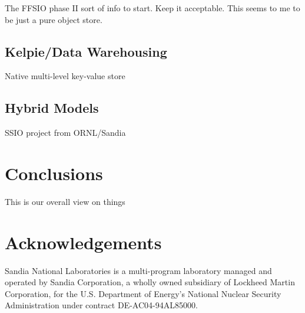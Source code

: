 The FFSIO phase II sort of info to start. Keep it acceptable. This seems to me
to be just a pure object store.

\subsection{Kelpie/Data Warehousing}

Native multi-level key-value store

\subsection{Hybrid Models}

SSIO project from ORNL/Sandia

\section{Conclusions}\label{sec:intro}

This is our overall view on things

\section*{Acknowledgements}
Sandia National Laboratories is a multi-program laboratory managed and operated
by Sandia Corporation, a wholly owned subsidiary of Lockheed Martin
Corporation, for the U.S. Department of Energy's National Nuclear Security
Administration under contract DE-AC04-94AL85000.




